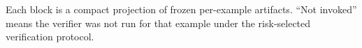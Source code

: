 \begin{table}[t]
\begin{threeparttable}
\begin{tabularx}{\textwidth}
\bottomrule
\end{tabularx}
\begin{tablenotes}
\footnotesize
\item Each block is a compact projection of frozen per-example artifacts. ``Not invoked'' means the verifier was not run for that example under the risk-selected verification protocol.
\end{tablenotes}
\end{threeparttable}
\end{table}
